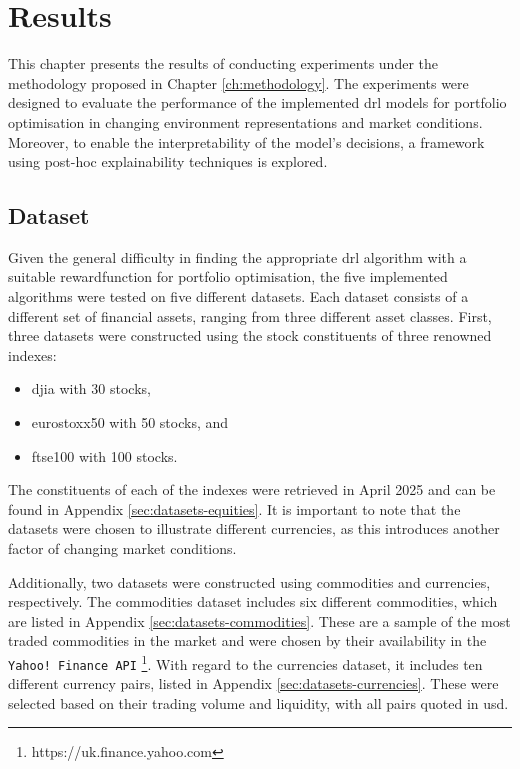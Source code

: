 \chapter{Results} \label{ch:results}

This chapter presents the results of conducting experiments under the methodology proposed in Chapter \ref{ch:methodology}. The experiments were designed to evaluate the performance of the implemented \acrshort{drl} models for portfolio optimisation in changing environment representations and market conditions. Moreover, to enable the interpretability of the model's decisions, a framework using post-hoc explainability techniques is explored.

\section{Dataset} \label{sec:dataset}

Given the general difficulty in finding the appropriate \acrshort{drl} algorithm with a suitable \gls{rewardfunction} for portfolio optimisation, the five implemented algorithms were tested on five different datasets. Each dataset consists of a different set of financial assets, ranging from three different asset classes. First, three datasets were constructed using the stock constituents of three renowned indexes:
\begin{itemize}
    \item \acrfull{djia} with 30 stocks,
    \item \acrfull{eurostoxx50} with 50 stocks, and
    \item \acrfull{ftse100} with 100 stocks.
\end{itemize}

The constituents of each of the indexes were retrieved in April 2025 and can be found in Appendix \ref{sec:datasets-equities}. It is important to note that the datasets were chosen to illustrate different currencies, as this introduces another factor of changing market conditions. 

Additionally, two datasets were constructed using commodities and currencies, respectively. The commodities dataset includes six different commodities, which are listed in Appendix \ref{sec:datasets-commodities}. These are a sample of the most traded commodities in the market and were chosen by their availability in the \texttt{Yahoo! Finance API} \footnote{https://uk.finance.yahoo.com}. With regard to the currencies dataset, it includes ten different currency pairs, listed in Appendix \ref{sec:datasets-currencies}. These were selected based on their trading volume and liquidity, with all pairs quoted in \acrfull{usd}.

